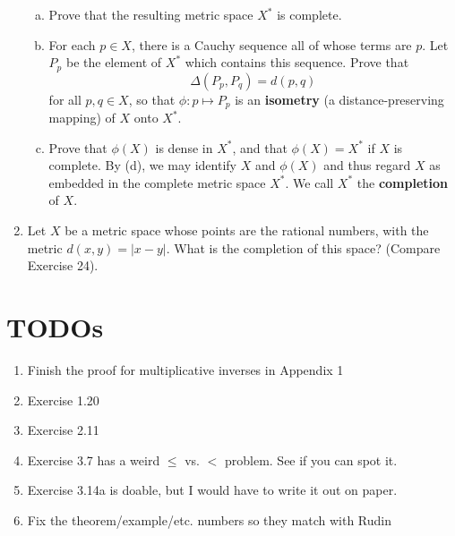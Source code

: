 \documentclass{scrbook}
\begin{document}
\begin{enumerate}
\begin{enumerate}[(a)]
\item Prove that the resulting metric space $X^*$ is complete.

\item For each $p \in X$, there is a Cauchy sequence all of whose terms are $p$. Let $P_p$ be the element of $X^*$ which contains this sequence. Prove that
\[
	\Delta(P_p, P_q) = d(p, q)
\]
for all $p, q \in X$, so that $\phi: p \mapsto P_p$ is an \textbf{isometry} (a distance-preserving mapping) of $X$ onto $X^*$.

\item Prove that $\phi(X)$ is dense in $X^*$, and that $\phi(X) = X^*$ if $X$ is complete. By (d), we may identify $X$ and $\phi(X)$ and thus regard $X$ as embedded in the complete metric space $X^*$. We call $X^*$ the \textbf{completion} of $X$.
\end{enumerate}

\item %
Let $X$ be a metric space whose points are the rational numbers, with the metric $d(x, y) = |x - y|$. What is the completion of this space? (Compare Exercise 24).


\end{enumerate}


\chapter{TODOs}

\begin{enumerate}
\item Finish the proof for multiplicative inverses in Appendix 1
\item Exercise 1.20
\item Exercise 2.11
\item Exercise 3.7 has a weird $\le$ vs. $<$ problem. See if you can spot it.
\item Exercise 3.14a is doable, but I would have to write it out on paper.
\item Fix the theorem/example/etc. numbers so they match with Rudin
\end{enumerate}
\end{document}
